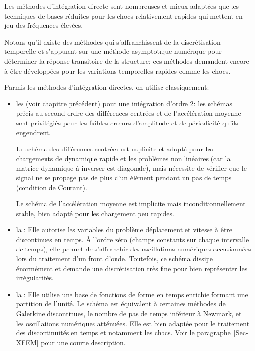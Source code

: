 Les méthodes d'intégration directe sont nombreuses et mieux adaptées que les
techniques de bases réduites pour les chocs relativement rapides qui mettent en jeu des
fréquences élevées.

Notons qu'il existe des méthodes qui s'affranchissent de la discrétisation temporelle et
s'appuient sur une méthode asymptotique numérique pour déterminer la réponse
transitoire de la structure; ces méthodes demandent encore à être
développées pour les variations temporelles rapides comme les chocs.

Parmis les méthodes d'intégration directes, on utilise classiquement:
\begin{itemize}
	\item les  (voir chapitre précédent) pour une intégration d'ordre 2:
		les schémas précis au second ordre des différences centrées et de
		l'accélération moyenne sont privilégiés pour les faibles erreurs d'amplitude
		et de périodicité qu'ils engendrent.
		
		Le schéma des différences centrées
		est explicite et adapté pour les chargements de dynamique rapide et les
		problèmes non linéaires (car la matrice dynamique à inverser est diagonale),
		mais nécessite de vérifier que le signal ne se propage pas de plus d'un élément
		pendant un pas de temps (condition de Courant).
		
		Le schéma de l'accélération moyenne est implicite mais inconditionnellement
		stable, bien adapté pour les chargement peu rapides.
	\item la :
		Elle autorise les variables du problème déplacement et vitesse à être
		discontinues en temps.
		À l'ordre zéro (champs constants sur chaque intervalle de temps), elle permet
		de s'affranchir des oscillations numériques occasionnées lors du traitement
		d'un front d'onde.
		Toutefois, ce schéma dissipe énormément et demande une discrétisation
		très fine pour bien représenter les irrégularités.
	\item la :
		Elle utilise une base de fonctions de forme en temps enrichie formant une partition de l'unité.
		Le schéma est équivalent à certaines méthodes de Galerkine discontinues, le nombre de
		pas de temps inférieur à Newmark, et les oscillations numériques atténuées.
		Elle est bien adaptée pour le traitement des discontinuités en temps et
		notamment les chocs. Voir le paragraphe~\ref{Sec-XFEM} pour une courte description.
\end{itemize}

